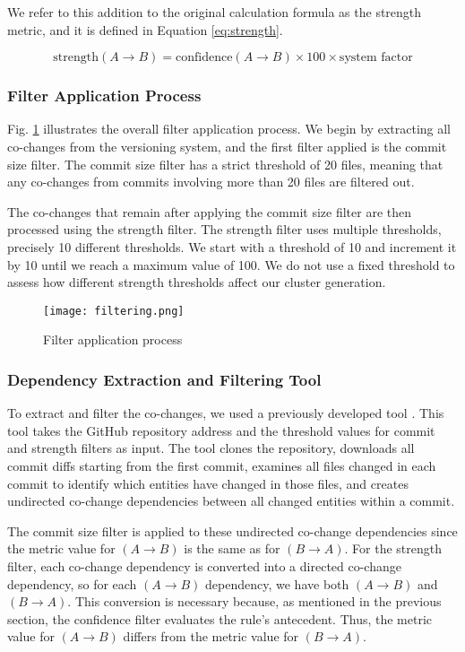 We refer to this addition to the original calculation formula as the strength metric, and it is defined in Equation \eqref{eq:strength}.

\begin{equation}
\text{strength}(A \rightarrow B) = \text{confidence}(A \rightarrow B) \times 100 \times \text{system factor}
\label{eq:strength}
\end{equation}


\subsubsection{Filter Application Process}

Fig. \ref{fig:filtering} illustrates the overall filter application process. We begin by extracting all co-changes from the versioning system, and the first filter applied is the commit size filter. The commit size filter has a strict threshold of 20 files, meaning that any co-changes from commits involving more than 20 files are filtered out.

The co-changes that remain after applying the commit size filter are then processed using the strength filter. The strength filter uses multiple thresholds, precisely 10 different thresholds. We start with a threshold of 10 and increment it by 10 until we reach a maximum value of 100. We do not use a fixed threshold to assess how different strength thresholds affect our cluster generation.

\begin{figure}[t!]
  \centering
  \texttt{[image: filtering.png]}
  \caption{Filter application process}
  \label{fig:filtering}
\end{figure}

\subsubsection{Dependency Extraction and Filtering Tool}

To extract and filter the co-changes, we used a previously developed tool \cite{b4}. This tool takes the GitHub repository address and the threshold values for commit and strength filters as input. The tool clones the repository, downloads all commit diffs starting from the first commit, examines all files changed in each commit to identify which entities have changed in those files, and creates undirected co-change dependencies between all changed entities within a commit.

The commit size filter is applied to these undirected co-change dependencies since the metric value for $(A \rightarrow B)$ is the same as for $(B \rightarrow A)$. For the strength filter, each co-change dependency is converted into a directed co-change dependency, so for each $(A \rightarrow B)$ dependency, we have both $(A \rightarrow B)$ and $(B \rightarrow A)$. This conversion is necessary because, as mentioned in the previous section, the confidence filter evaluates the rule's antecedent. Thus, the metric value for $(A \rightarrow B)$ differs from the metric value for $(B \rightarrow A)$.

